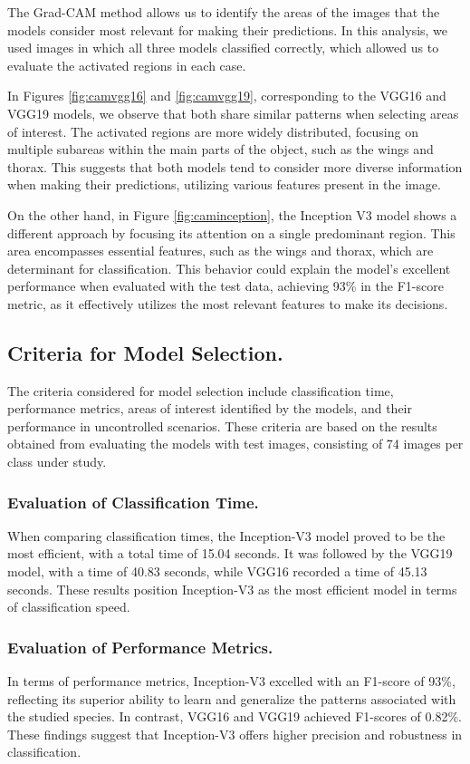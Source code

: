 The Grad-CAM method allows us to identify the areas of the images that the models consider most relevant for making their predictions. In this analysis, we used images in which all three models classified correctly, which allowed us to evaluate the activated regions in each case.

In Figures \ref{fig:camvgg16} and \ref{fig:camvgg19}, corresponding to the VGG16 and VGG19 models, we observe that both share similar patterns when selecting areas of interest. The activated regions are more widely distributed, focusing on multiple subareas within the main parts of the object, such as the wings and thorax. This suggests that both models tend to consider more diverse information when making their predictions, utilizing various features present in the image.

On the other hand, in Figure \ref{fig:caminception}, the Inception V3 model shows a different approach by focusing its attention on a single predominant region. This area encompasses essential features, such as the wings and thorax, which are determinant for classification. This behavior could explain the model's excellent performance when evaluated with the test data, achieving 93\% in the F1-score metric, as it effectively utilizes the most relevant features to make its decisions.

\subsection{Criteria for Model Selection.}
The criteria considered for model selection include classification time, performance metrics, areas of interest identified by the models, and their performance in uncontrolled scenarios. These criteria are based on the results obtained from evaluating the models with test images, consisting of 74 images per class under study.

\subsubsection{Evaluation of Classification Time.}
When comparing classification times, the Inception-V3 model proved to be the most efficient, with a total time of 15.04 seconds. It was followed by the VGG19 model, with a time of 40.83 seconds, while VGG16 recorded a time of 45.13 seconds. These results position Inception-V3 as the most efficient model in terms of classification speed.

\subsubsection{Evaluation of Performance Metrics.}
In terms of performance metrics, Inception-V3 excelled with an F1-score of 93\%, reflecting its superior ability to learn and generalize the patterns associated with the studied species. In contrast, VGG16 and VGG19 achieved F1-scores of 0.82\%. These findings suggest that Inception-V3 offers higher precision and robustness in classification.


